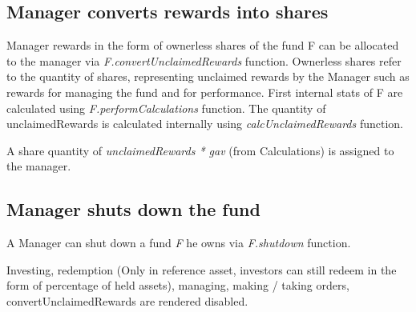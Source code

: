 \documentclass[conference]{IEEEtran}
\begin{document}
\subsection{Manager converts rewards into shares}

Manager rewards in the form of ownerless shares of the fund F can be allocated to the manager via \textit{F.convertUnclaimedRewards} function. Ownerless shares refer to the quantity of shares, representing unclaimed rewards by the Manager such as rewards for managing the fund and for performance. First internal stats of F are calculated using \textit{F.performCalculations} function. The quantity of unclaimedRewards is calculated internally using \textit{calcUnclaimedRewards} function.

A share quantity of \textit{unclaimedRewards * gav} (from Calculations) is assigned to the manager.

\subsection{Manager shuts down the fund}

A Manager can shut down a fund \textit{F} he owns via \textit{F.shutdown} function.

Investing, redemption (Only in reference asset, investors can still redeem in the form of percentage of held assets), managing, making / taking orders, convertUnclaimedRewards are rendered disabled.
%
%
\end{document}
